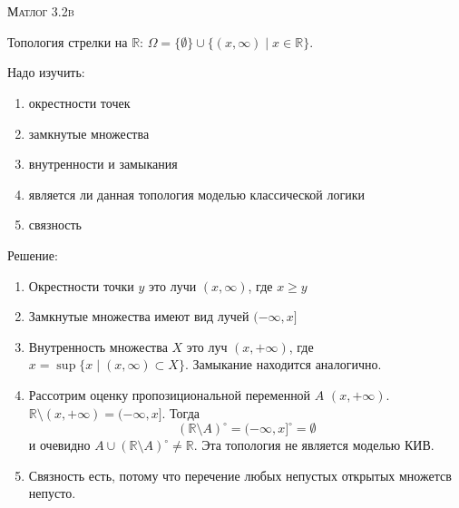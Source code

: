 \documentclass[10pt]{article}
\begin{document}
\def\chap#1#2{\ \\ {\large\bf#1 \ | \ \tt\scshape#2} \par}

\ \vspace{-1cm}

{\bf
\ \\
\Large\centerline{\scshape Матлог 3.2b}
}\normalsize

\vspace*{1cm}
Топология стрелки на $\mathbb{R}$: $\Omega = \{\emptyset\}\cup \{(x, \infty) \mid x\in \mathbb{R}\}$.

Надо изучить: 
\begin{enumerate}
    \item окрестности точек
    \item замкнутые множества
    \item внутренности и замыкания
    \item является ли данная топология моделью классической логики
    \item связность
\end{enumerate}

Решение: 

\begin{enumerate}
    \item Окрестности точки $y$ это лучи $(x, \infty)$, где $x \geqslant y$
    \item Замкнутые множества имеют вид лучей $(-\infty, x]$
    \item Внутренность множества $X$ это луч $(x, +\infty)$, где $x = \sup \{x \mid (x,\infty)\subset X\}$. Замыкание находится аналогично.
    \item Рассотрим оценку пропозициональной переменной $A$ $(x, +\infty)$.
    $\mathbb{R} \setminus (x,+\infty) = (-\infty, x]$.  
    Тогда 
    \[ (\mathbb{R} \setminus A)^\circ = (-\infty, x]^\circ = \emptyset \]
    и очевидно $A \cup (\mathbb{R} \setminus A)^\circ \neq \mathbb{R}$. Эта топология не является моделью КИВ.
    \item Связность есть, потому что перечение любых непустых открытых множетсв непусто. 
\end{enumerate}
\end{document}
